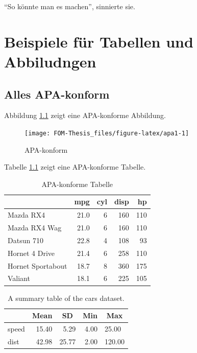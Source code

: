 ``So könnte man es machen'', sinnierte sie.


\hypertarget{beispiele-fur-tabellen-und-abbiludngen}{%
\chapter{Beispiele für Tabellen und Abbiludngen}\label{beispiele-fur-tabellen-und-abbiludngen}}

\hypertarget{alles-apa-konform}{%
\section{Alles APA-konform}\label{alles-apa-konform}}

\noindent Abbildung \ref{fig:apa1} zeigt eine APA-konforme Abbildung.

\begin{figure}[h]

{\centering \texttt{[image: FOM-Thesis\_files/figure-latex/apa1-1]} 

}

\caption{APA-konform}\label{fig:apa1}
\end{figure}

\noindent Tabelle \ref{tab:mtcars1} zeigt eine APA-konforme Tabelle.

\begin{table}[!h]

\caption{\label{tab:mtcars1}APA-konforme Tabelle}
\begin{tabular}{lrrrr}
\toprule
  & mpg & cyl & disp & hp\\
\midrule
Mazda RX4 & 21.0 & 6 & 160 & 110\\
Mazda RX4 Wag & 21.0 & 6 & 160 & 110\\
Datsun 710 & 22.8 & 4 & 108 & 93\\
Hornet 4 Drive & 21.4 & 6 & 258 & 110\\
Hornet Sportabout & 18.7 & 8 & 360 & 175\\
\addlinespace
Valiant & 18.1 & 6 & 225 & 105\\
\bottomrule
\end{tabular}
\end{table}

\begin{table}[tbp]
\begin{center}
\begin{threeparttable}
\caption{\label{tab:mtcars2}A summary table of the cars dataset.}
\begin{tabular}{lrrrl}
\toprule
 & \multicolumn{1}{c}{Mean} & \multicolumn{1}{c}{SD} & \multicolumn{1}{c}{Min} & \multicolumn{1}{c}{Max}\\
\midrule
speed & 15.40 & 5.29 & 4.00 & 25.00\\
dist & 42.98 & 25.77 & 2.00 & 120.00\\
\bottomrule
\end{tabular}
\end{threeparttable}
\end{center}
\end{table}

